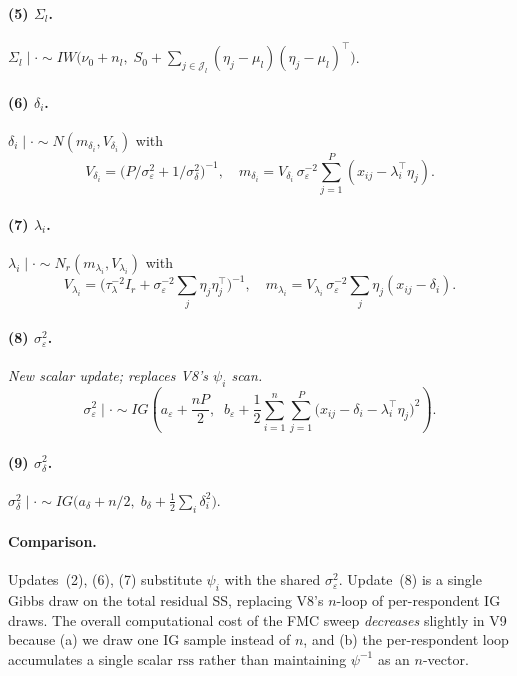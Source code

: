 \documentclass[11pt]{article}
\begin{document}
\paragraph{(5) $\Sigma_l$.}
$\Sigma_l\mid\cdot\sim IW\bigl(\nu_0+n_l,\;S_0+\sum_{j\in\mathcal{J}_l}(\eta_j-\mu_l)(\eta_j-\mu_l)^\top\bigr)$.

\paragraph{(6) $\delta_i$.}
$\delta_i\mid\cdot\sim N(m_{\delta_i},V_{\delta_i})$ with
\begin{equation}
V_{\delta_i}=\bigl(P/\sigma_\varepsilon^2+1/\sigma_\delta^2\bigr)^{-1},
\quad
m_{\delta_i}=V_{\delta_i}\,\sigma_\varepsilon^{-2}\sum_{j=1}^P(x_{ij}-\lambda_i^\top\eta_j).
\label{eq:delta-update-v9}
\end{equation}

\paragraph{(7) $\lambda_i$.}
$\lambda_i\mid\cdot\sim N_r(m_{\lambda_i},V_{\lambda_i})$ with
\begin{equation}
V_{\lambda_i}=\bigl(\tau_\lambda^{-2}I_r+\sigma_\varepsilon^{-2}\textstyle\sum_j\eta_j\eta_j^\top\bigr)^{-1},
\quad
m_{\lambda_i}=V_{\lambda_i}\,\sigma_\varepsilon^{-2}\textstyle\sum_j\eta_j(x_{ij}-\delta_i).
\label{eq:lambda-update-v9}
\end{equation}

\paragraph{(8) $\sigma_\varepsilon^2$.} \emph{New scalar update; replaces V8's $\psi_i$ scan.}
\begin{equation}
\sigma_\varepsilon^2\mid\cdot\sim
IG\!\left(a_\varepsilon+\frac{nP}{2},\;\;b_\varepsilon+\frac{1}{2}\sum_{i=1}^n\sum_{j=1}^P\bigl(x_{ij}-\delta_i-\lambda_i^\top\eta_j\bigr)^2\right).
\label{eq:sigma-eps-update-v9}
\end{equation}

\paragraph{(9) $\sigma_\delta^2$.}
$\sigma_\delta^2\mid\cdot\sim IG\bigl(a_\delta+n/2,\;b_\delta+\tfrac12\sum_i\delta_i^2\bigr)$.

\paragraph{Comparison.} Updates~(2), (6), (7) substitute $\psi_i$ with the
shared $\sigma_\varepsilon^2$. Update~(8) is a single Gibbs draw on the
total residual SS, replacing V8's $n$-loop of per-respondent IG draws.
The overall computational cost of the FMC sweep \emph{decreases} slightly
in V9 because (a) we draw one IG sample instead of $n$, and (b) the
per-respondent loop accumulates a single scalar $\mathrm{rss}$
rather than maintaining $\psi^{-1}$ as an $n$-vector.
\end{document}
